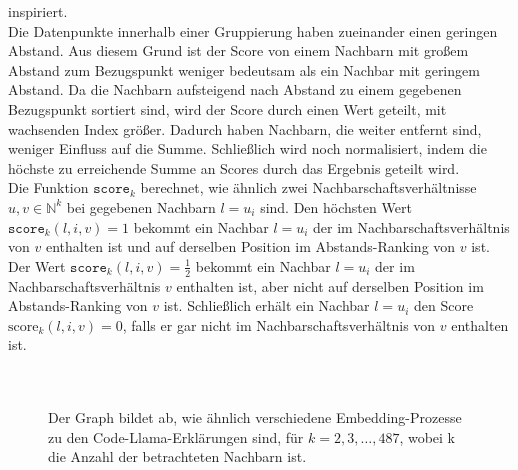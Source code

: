 \documentclass[12pt,letterpaper,ngerman]{article}
\begin{document}
inspiriert\cite{ndcg}.\\
Die Datenpunkte innerhalb einer Gruppierung haben zueinander einen
geringen Abstand. Aus diesem Grund ist der Score von einem
Nachbarn mit großem Abstand zum Bezugspunkt weniger bedeutsam als 
ein Nachbar mit geringem Abstand. Da die Nachbarn aufsteigend nach
Abstand zu einem gegebenen Bezugspunkt sortiert sind, wird der 
Score durch einen Wert geteilt, mit wachsenden Index größer.
Dadurch haben Nachbarn, die weiter entfernt sind, weniger Einfluss
auf die Summe. Schließlich wird noch
normalisiert, indem die höchste zu erreichende Summe an Scores
durch das Ergebnis geteilt wird. \\
Die Funktion $\texttt{score}_k$ berechnet, wie ähnlich zwei 
Nachbarschaftsverhältnisse $u, v \in \mathbb{N}^k$ bei  gegebenen
Nachbarn $l = u_i$ sind. Den  höchsten Wert 
$\texttt{score}_k(l, i, v) = 1$
bekommt ein Nachbar $l = u_i$ der im Nachbarschaftsverhältnis von $v$
enthalten ist und auf derselben Position im Abstands-Ranking von $v$
ist. 
Der Wert $\texttt{score}_k(l, i, v) = \frac{1}{2}$ bekommt ein Nachbar
$l = u_i$ der im Nachbarschaftsverhältnis $v$ enthalten ist, aber nicht auf
derselben Position im Abstands-Ranking von $v$ ist. Schließlich erhält ein 
Nachbar $l = u_i$ den Score $\text{score}_k(l, i, v) = 0$, falls er gar nicht
im Nachbarschaftsverhältnis von $v$ enthalten ist.\\
\hfill\\
\pagebreak
\hfill\\
\begin{figure}
  \begin{center}
  \end{center}
  \caption{
    Der Graph bildet ab, wie ähnlich verschiedene Embedding-Prozesse
    zu den Code-Llama-Erklärungen sind, für $k=2,3, \dots ,487 $, wobei
    k die Anzahl der betrachteten Nachbarn ist.
  }
\end{figure}\\
\end{document}
